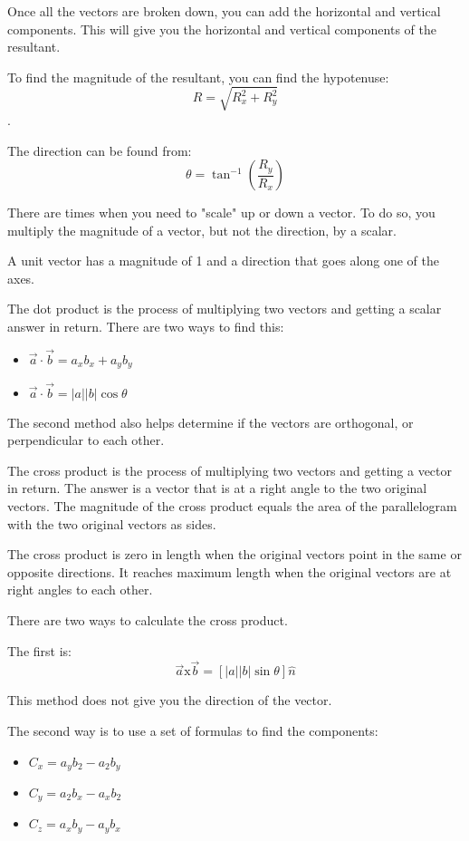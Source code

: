 \documentclass[../em.tex]{subfiles}
\begin{document}
Once all the vectors are broken down, you can add the horizontal and vertical components. 
This will give you the horizontal and vertical components of the resultant.

To find the magnitude of the resultant, you can find the hypotenuse: 
\[R = \sqrt{R_x^2+R_y^2}\]. 

The direction can be found from:
\[\theta = \tan^{-1}\left(\frac{R_y}{R_x}\right)\]

There are times when you need to "scale" up or down a vector. To do so, 
you multiply the magnitude of a vector, but not the direction, by a scalar.

A unit vector has a magnitude of 1 and a direction that goes along one of the axes. 

The dot product is the process of multiplying two vectors and getting a scalar answer in return. There are two ways to find this:
\begin{itemize}
    \item $\vec{a}\cdot \vec{b} = a_xb_x+a_yb_y$
    \item $\vec{a}\cdot \vec{b} = |a||b|\cos \theta$
\end{itemize}

The second method also helps determine if the vectors are orthogonal, or perpendicular to each other.

The cross product is the process of multiplying two vectors and getting a vector in return. 
The answer is a vector that is at a right angle to the two original vectors. The magnitude 
of the cross product equals the area of the parallelogram with the two original vectors as sides.

The cross product is zero in length when the original vectors point in the same or 
opposite directions. It reaches maximum length when the original vectors are at right angles to each other.

There are two ways to calculate the cross product.

The first is:
\[\vec{a} \text{x} \vec{b} = [|a||b|\sin \theta]\hat{n}\]

This method does not give you the direction of the vector.

The second way is to use a set of formulas to find the components:
\begin{itemize}
    \item $C_x=a_yb_2-a_2b_y$
    \item $C_y=a_2b_x-a_xb_2$
    \item $C_z=a_xb_y-a_yb_x$
\end{itemize}
\end{document}
